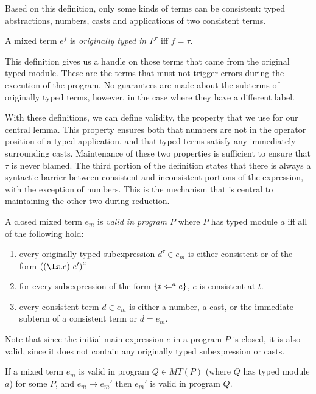 {Based on this definition, only some kinds of terms can be consistent:
typed abstractions, numbers, casts and applications of two consistent
terms.

\begin{definition}
  A mixed term $e^f$ is \emph{originally typed in $P^\tau$} iff $f = \tau$.
\end{definition}
\noindent
This definition gives us a handle on those terms that came from the
original typed module.  These are the terms that must not trigger errors
during the execution of the program.  No guarantees are made about the
subterms of originally typed terms, however, in the case where they have a
different label.

With these definitions, we can define validity, the property that we use for our
central lemma.  This property ensures both that numbers are
not in the operator position of a typed application, and that typed
terms satisfy any immediately surrounding casts.  Maintenance of these
two properties is sufficient to ensure that $\tau$ is never blamed.  The
third portion of the definition states that there is always a syntactic
barrier between consistent and inconsistent portions of the expression,
with the exception of numbers.  This is the mechanism that is central
to maintaining the other two during reduction.

\begin{definition}
  A closed mixed term $e_m$ is \emph{valid in program $P$} where $P$
  has typed module $a$ iff all of the following hold:
  \begin{enumerate}
  \item every originally typed subexpression $d^\tau \in e_m$  is either consistent
    or of the form ${\comb{\dlsabs{x}{e}}{e'}}^\tau$
  \item for every subexpression of the form $\{t \Leftarrow^{a} e\}$, $e$
    is consistent at $t$.
  \item every consistent term $d \in e_m$ is either a number, a cast, or the
    immediate subterm of a consistent term or $d = e_m$.
  \end{enumerate}
\end{definition}

Note that since the initial main expression $e$ in a program $P$ is
closed, it is also valid, since it does not contain any
originally typed subexpression or casts.

\begin{lemma}
  \label{lem:central}
  If a mixed term $e_m$ is valid in program $Q \in MT(P)$ (where $Q$
  has typed module $a$) for
  some $P$, and $e_m \rightarrow e_m'$ then $e_m'$
  is valid in program $Q$.  
\end{lemma}

}
